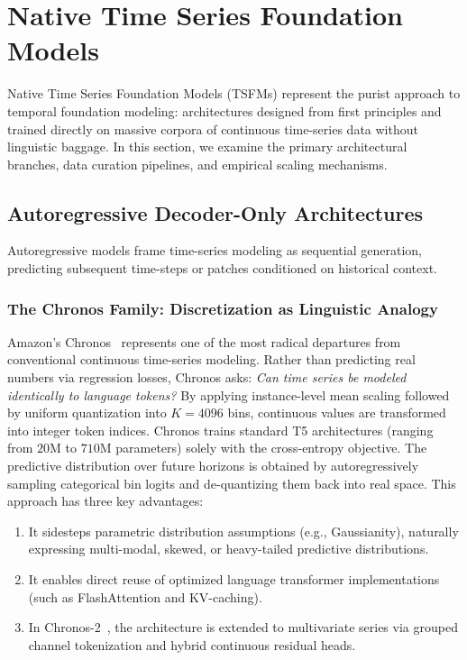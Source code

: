 \section{Native Time Series Foundation Models}
\label{sec:native}

Native Time Series Foundation Models (TSFMs) represent the purist approach to temporal foundation modeling: architectures designed from first principles and trained directly on massive corpora of continuous time-series data without linguistic baggage. In this section, we examine the primary architectural branches, data curation pipelines, and empirical scaling mechanisms.

\subsection{Autoregressive Decoder-Only Architectures}

Autoregressive models frame time-series modeling as sequential generation, predicting subsequent time-steps or patches conditioned on historical context.

\subsubsection{The Chronos Family: Discretization as Linguistic Analogy}
Amazon's Chronos~\cite{ansari2024chronos} represents one of the most radical departures from conventional continuous time-series modeling. Rather than predicting real numbers via regression losses, Chronos asks: \emph{Can time series be modeled identically to language tokens?}
By applying instance-level mean scaling followed by uniform quantization into $K = 4096$ bins, continuous values are transformed into integer token indices. Chronos trains standard T5 architectures (ranging from $20\text{M}$ to $710\text{M}$ parameters) solely with the cross-entropy objective.
The predictive distribution over future horizons is obtained by autoregressively sampling categorical bin logits and de-quantizing them back into real space. This approach has three key advantages:
\begin{enumerate}[leftmargin=*]
    \item It sidesteps parametric distribution assumptions (e.g., Gaussianity), naturally expressing multi-modal, skewed, or heavy-tailed predictive distributions.
    \item It enables direct reuse of optimized language transformer implementations (such as FlashAttention and KV-caching).
    \item In Chronos-2~\cite{ansari2025chronos2}, the architecture is extended to multivariate series via grouped channel tokenization and hybrid continuous residual heads.
\end{enumerate}

